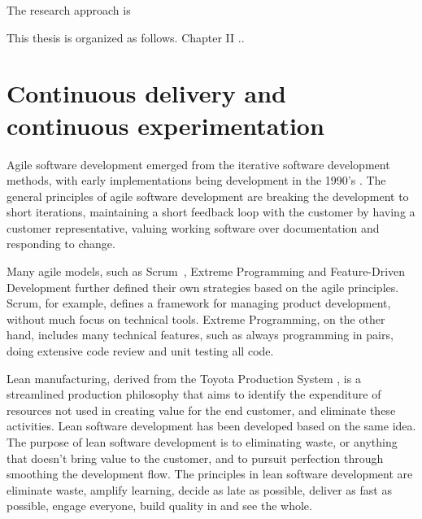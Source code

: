 \documentclass[english]{tktltiki2}
\theoremstyle{definition}
\theoremstyle{remark}
\begin{document}
The research approach is %

This thesis is organized as follows. Chapter II ..
%

\section{Continuous delivery and continuous experimentation}
Agile software development emerged from the iterative software development methods, with early implementations being development in the 1990's \cite{dybaa2008empirical}. The general principles of agile software development are breaking the development to short iterations, maintaining a short feedback loop with the customer by having a customer representative, valuing working software over documentation and responding to change.

Many agile models, such as Scrum \cite{schwaber2002gile}, Extreme Programming \cite{beck2000extreme} and Feature-Driven Development \cite{palmer2001practical} further defined their own strategies based on the agile principles. Scrum, for example, defines a framework for managing product development, without much focus on technical tools. Extreme Programming, on the other hand, includes many technical features, such as always programming in pairs, doing extensive code review and unit testing all code.

Lean manufacturing, derived from the Toyota Production System \cite{ono1988toyota}, is a streamlined production philosophy that aims to identify the expenditure of resources not used in creating value for the end customer, and eliminate these activities. Lean software development \cite{poppendieck2003lean} has been developed based on the same idea. The purpose of lean software development is to eliminating waste, or anything that doesn't bring value to the customer, and to pursuit perfection through smoothing the development flow. The principles in lean software development are eliminate waste, amplify learning, decide as late as possible, deliver as fast as possible, engage everyone, build quality in and see the whole. 
\end{document}
